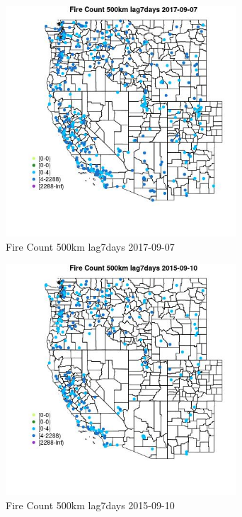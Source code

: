 \begin{figure} 
\centering  
\includegraphics[width=0.77\textwidth]{Code_Outputs/Report_ML_input_PM25_Step4_part_e_de_duplicated_aves_compiled_2019-05-20wNAs_MapObsFire_Count_500km_lag7days2017-09-07.jpg} 
\caption{\label{fig:Report_ML_input_PM25_Step4_part_e_de_duplicated_aves_compiled_2019-05-20wNAsMapObsFire_Count_500km_lag7days2017-09-07}Fire Count 500km lag7days 2017-09-07} 
\end{figure} 
 

\begin{figure} 
\centering  
\includegraphics[width=0.77\textwidth]{Code_Outputs/Report_ML_input_PM25_Step4_part_e_de_duplicated_aves_compiled_2019-05-20wNAs_MapObsFire_Count_500km_lag7days2015-09-10.jpg} 
\caption{\label{fig:Report_ML_input_PM25_Step4_part_e_de_duplicated_aves_compiled_2019-05-20wNAsMapObsFire_Count_500km_lag7days2015-09-10}Fire Count 500km lag7days 2015-09-10} 
\end{figure} 
 

